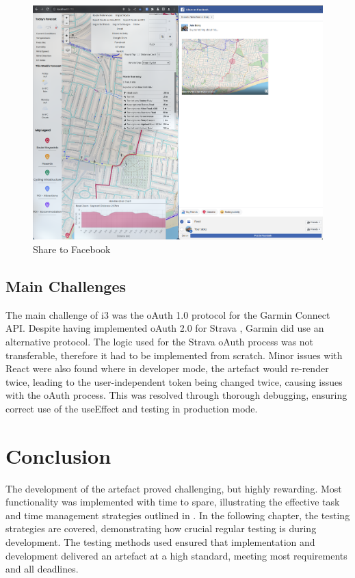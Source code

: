 \begin{figure}[!ht]
  \centering
  \includegraphics[width=425px]{figures/Progress Images/Iteration-3/SR51/SR51-Share to Facebook.png}
  \caption{Share to Facebook}
  \label{fig:facebook-share}
\end{figure}

\subsection{Main Challenges}
\label{iteration3:main-challenges}

The main challenge of i3 was the oAuth 1.0 protocol for the Garmin Connect API. Despite having implemented oAuth 2.0 for Strava , Garmin did use an alternative protocol. The logic used for the Strava oAuth process was not transferable, therefore it had to be implemented from scratch. Minor issues with React were also found where in developer mode, the artefact would re-render twice, leading to the user-independent token being changed twice, causing issues with the oAuth process. This was resolved through thorough debugging, ensuring correct use of the useEffect and testing in production mode.

\section{Conclusion}
\label{implementation:conclusion}

The development of the artefact proved challenging, but highly rewarding. Most functionality was implemented with time to spare, illustrating the effective task and time management strategies outlined in . In the following chapter, the testing strategies are covered, demonstrating how crucial regular testing is during development. The testing methods used ensured that implementation and development delivered an artefact at a high standard, meeting most requirements and all deadlines.